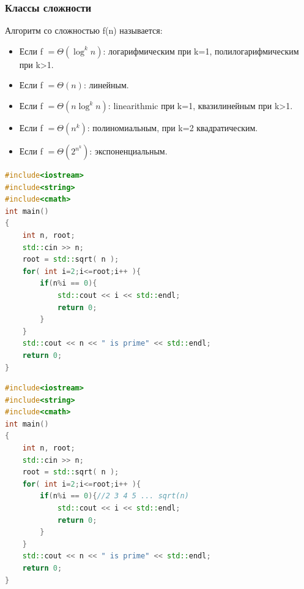\documentclass[russian, 12pt]{beamer}
\begin{document}
\lstset{style=mystyle}
\begin{frame}

\end{frame}
\begin{frame}
\frametitle{Классы сложности}
Алгоритм со сложностью f(n) называется:
\begin{itemize}
  \item Если f $=\Theta(\log^kn)$: 
  логарифмическим при k=1, полилогарифмическим при k>1.\\[0.3cm]

  \item Если f $=\Theta(n)$: 
  линейным.\\[0.3cm]

  \item Если f $=\Theta(n\log^kn)$: 
  linearithmic при k=1, квазилинейным при k>1.\\[0.3cm]
  
  \item Если f $=\Theta(n^k)$: 
  полиномиальным, при k=2 квадратическим. \\[0.3cm]
  
  \item Если f $=\Theta(2^{n^k})$: 
  экспоненциальным. \\

\end{itemize}
\end{frame}
\lstset{style=mystyle}
\begin{frame}[fragile]
%
\begin{lstlisting}[language=C++]
#include<iostream> 
#include<string>
#include<cmath>
int main()
{
    int n, root;
    std::cin >> n;
    root = std::sqrt( n );
    for( int i=2;i<=root;i++ ){
        if(n%i == 0){
            std::cout << i << std::endl;
            return 0;
        }
    }
    std::cout << n << " is prime" << std::endl;
    return 0;
}  
\end{lstlisting}
\end{frame}
\lstset{style=mystyle}
\begin{frame}[fragile]
%
\begin{lstlisting}[language=C++]
#include<iostream> 
#include<string>
#include<cmath>
int main()
{
    int n, root;
    std::cin >> n;
    root = std::sqrt( n );
    for( int i=2;i<=root;i++ ){
        if(n%i == 0){//2 3 4 5 ... sqrt(n)
            std::cout << i << std::endl;
            return 0;
        }
    }
    std::cout << n << " is prime" << std::endl;
    return 0;
}  
\end{lstlisting}
\end{frame}
\end{document}
